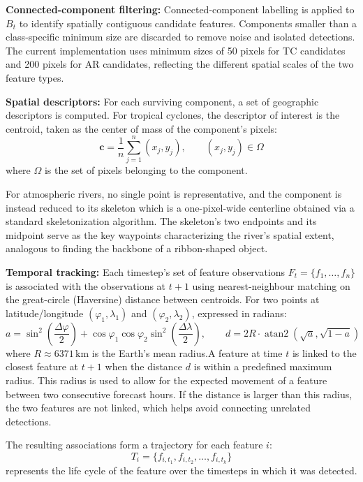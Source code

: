 \documentclass[journal abbreviation, manuscript]{copernicus}
\begin{document}
\textbf{Connected-component filtering:} Connected-component labelling is applied to $B_t$ to identify spatially contiguous candidate features. Components smaller than a class-specific minimum size are discarded to remove noise and isolated detections. The current implementation uses minimum sizes of 50 pixels for TC candidates and 200 pixels for AR candidates, reflecting the different spatial scales of the two feature types.

\textbf{Spatial descriptors:} For each surviving component, a set of geographic descriptors is computed. For tropical cyclones, the descriptor of interest is the centroid, taken as the center of mass of the component's pixels:
\begin{equation}
\mathbf{c} = \frac{1}{n}\sum_{j=1}^{n}(x_j,y_j),
\qquad
(x_j,y_j) \in \Omega
\tag{2}
\end{equation}
where $\Omega$ is the set of pixels belonging to the component.

For atmospheric rivers, no single point is representative, and the component is instead reduced to its skeleton which is a one-pixel-wide centerline obtained via a standard skeletonization algorithm. The skeleton's two endpoints and its midpoint serve as the key waypoints characterizing the river's spatial extent, analogous to finding the backbone of a ribbon-shaped object.

\textbf{Temporal tracking:} Each timestep's set of feature observations $F_t = \{f_1,\dots,f_n\}$ is associated with the observations at $t+1$ using nearest-neighbour matching on the great-circle (Haversine) distance between centroids. For two points at latitude/longitude $(\varphi_1,\lambda_1)$ and $(\varphi_2,\lambda_2)$, expressed in radians:
\begin{equation}
a =
\sin^2\!\left(\frac{\Delta\varphi}{2}\right)
+
\cos\varphi_1\cos\varphi_2
\sin^2\!\left(\frac{\Delta\lambda}{2}\right),
\qquad
d =
2R \cdot
\operatorname{atan2}\!\left(\sqrt{a},\sqrt{1-a}\right)
\tag{3}
\end{equation}
where $R \approx 6371\,\text{km}$ is the Earth's mean radius.A feature at time $t$ is linked to the closest feature at $t+1$ when the distance $d$ is within a predefined maximum radius. This radius is used to allow for the expected movement of a feature between two consecutive forecast hours. If the distance is larger than this radius, the two features are not linked, which helps avoid connecting unrelated detections. 

The resulting associations form a trajectory for each feature $i$:
\begin{equation}
T_i = \{f_{i,t_1}, f_{i,t_2}, \dots, f_{i,t_k}\}
\tag{4}
\end{equation} represents the life cycle of the feature over the timesteps in which it was detected.
\end{document}
